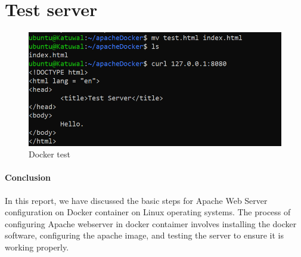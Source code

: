 \documentclass[12pt]{article}
\begin{document}
\section{Test server}
\begin{figure}[h!]
    \centering
    \includegraphics[scale = 0.70]{Images/serverRun.PNG}
    \caption{Docker test}
\end{figure}
\paragraph{Conclusion\\}
In this report, we have discussed the basic steps for Apache Web Server configuration on Docker
container on Linux operating systems. 
The process of configuring Apache webserver in docker contaimer involves 
installing the docker software, 
configuring the apache image, and 
testing the server to ensure it is working properly.
\end{document}
